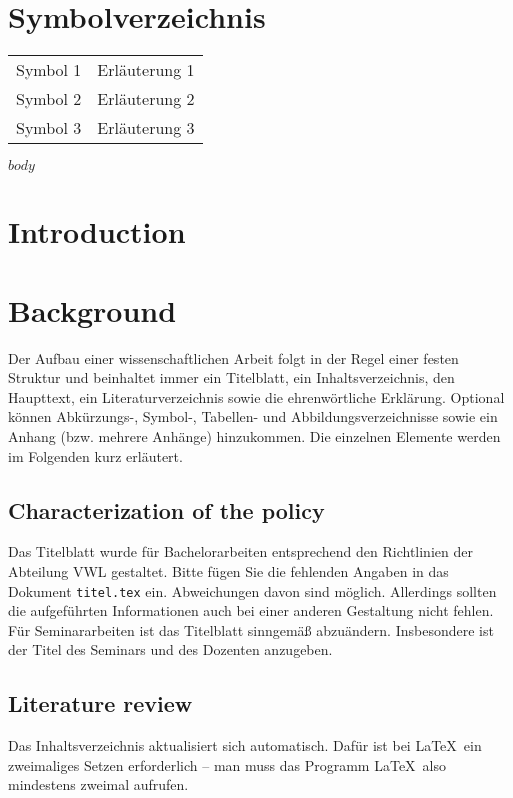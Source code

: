 \documentclass{scrbook}
\begin{document}
\listoftables

\chapter*{Symbolverzeichnis}\label{sv}
\begin{tabular}{ll}
Symbol 1 & Erläuterung 1 \\
Symbol 2 & Erläuterung 2\\
Symbol 3 & Erläuterung 3\\
\end{tabular}
 
\mainmatter

$body$

\chapter{Introduction}

\chapter{Background}

Der Aufbau einer wissenschaftlichen Arbeit folgt in der Regel einer festen Struktur und beinhaltet immer ein Titelblatt, ein Inhaltsverzeichnis, den Haupttext, ein Literaturverzeichnis sowie die ehrenwörtliche Erklärung. Optional können Abkürzungs-, Symbol-, Tabellen- und Abbildungsverzeichnisse sowie ein Anhang (bzw. mehrere Anhänge) hinzukommen. Die einzelnen Elemente werden im Folgenden kurz erläutert.

\section{Characterization of the policy}
Das Titelblatt wurde für Bachelorarbeiten entsprechend den Richtlinien der Abteilung VWL gestaltet. Bitte fügen Sie die fehlenden Angaben in das Dokument \texttt{titel.tex} ein. Abweichungen davon sind möglich. Allerdings sollten die aufgeführten Informationen auch bei einer anderen Gestaltung nicht fehlen. Für Seminararbeiten ist das Titelblatt sinngemäß abzuändern. Insbesondere ist der Titel des Seminars und des Dozenten anzugeben.

\section{Literature review}
Das Inhaltsverzeichnis aktualisiert sich automatisch. Dafür ist bei \LaTeX\ ein zweimaliges Setzen erforderlich – man muss das Programm \LaTeX\ also mindestens zweimal aufrufen.
\end{document}

